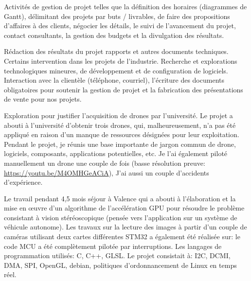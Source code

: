 \documentclass[helvetica,french,logo,notitle,totpages,utf8]{europecv2013}
\begin{document}

\begin{europecv}
\ecvpersonalinfo[10pt]




{
Activités de gestion de projet telles que la définition des horaires (diagrammes de Gantt), délimitant des projets par buts / livrables, de faire des propositions d'affaires à des clients, négocier les détails, le suivi de l'avancement du projet, contact consultants, la gestion des budgets et la divulgation des résultats.
}

{
Rédaction des résultats du projet rapports et autres documents techniques. Certains intervention dans les projets de l'industrie. Recherche et explorations technologiques mineures, de développement et de configuration de logiciels. Interaction avec la clientèle (téléphone, courriel), l'écriture des documents obligatoires pour soutenir la gestion de projet et la fabrication des présentations de vente pour nos projets.
}

{
Exploration pour justifier l'acquisition de drones par l'université. Le projet a abouti à l'université d'obtenir trois drones, qui, malheureusement, n'a pas été appliqué en raison d'un manque de ressources désignées pour leur exploitation. Pendant le projet, je réunis une base importante de jargon commun de drone, logiciels, composants, applications potentielles, etc. Je l'ai également piloté manuellement un drone une couple de fois (basse résolution preuve: \href{https://youtu.be/M4OMHGeACiA}{https://youtu.be/M4OMHGeACiA}), J'ai aussi un couple d'accidents d'expérience.
}

{
Le travail pendant 4,5 mois séjour à Valence qui a abouti à l'élaboration et la mise en œuvre d'un algorithme de l'accélération GPU pour résoudre le problème consistant à vision stéréoscopique (pensée vers l'application sur un système de véhicule autonome). Les travaux sur la lecture des images à partir d'un couple de caméras utilisant deux cartes différentes STM32 a également été réalisée sur: le code MCU a été complètement pilotée par interruptions. Les langages de programmation utilisés: C, C++, GLSL. Le projet consistait à: I2C, DCMI, DMA, SPI, OpenGL, debian, politiques d'ordonnancement de Linux en temps réel.
}


\end{europecv}
\end{document}
